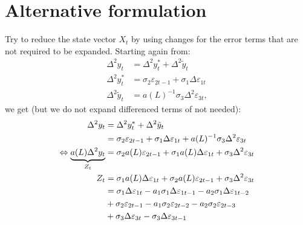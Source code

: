 \documentclass[a4paper,12pt]{article}
\begin{document}
\section{Alternative formulation}

Try to reduce the state vector $X_{t}$ by using changes for the error terms
that are not required to be expanded. Starting again from:%
\begin{align}
\Delta ^{2}y_{t}& =\Delta ^{2}y_{t}^{\ast }+\Delta ^{2}\tilde{y}_{t} \\
\Delta ^{2}y_{t}^{\ast }& =\sigma _{2}\varepsilon _{2t-1}+\sigma _{1}\Delta
\varepsilon _{1t} \\
\Delta ^{2}\tilde{y}_{t}& =a(L)^{-1}\sigma _{3}\Delta ^{2}\varepsilon _{3t},
\end{align}%
we get (but we do not expand differenced terms of not needed):%
\begin{align}
\Delta ^{2}y_{t}& =\Delta ^{2}y_{t}^{\ast }+\Delta ^{2}\tilde{y}_{t}  \notag
\\
& =\sigma _{2}\varepsilon _{2t-1}+\sigma _{1}\Delta \varepsilon
_{1t}+a(L)^{-1}\sigma _{3}\Delta ^{2}\varepsilon _{3t}  \notag \\
\Leftrightarrow \underbrace{a(L)\Delta ^{2}y_{t}}_{Z_{t}}& =\sigma
_{2}a(L)\varepsilon _{2t-1}+\sigma _{1}a(L)\Delta \varepsilon _{1t}+\sigma
_{3}\Delta ^{2}\varepsilon _{3t}  \notag \\
Z_{t}& =\sigma _{1}a(L)\Delta \varepsilon _{1t}+\sigma _{2}a(L)\varepsilon
_{2t-1}+\sigma _{3}\Delta ^{2}\varepsilon _{3t}  \notag \\
& =\sigma _{1}\Delta \varepsilon _{1t}-a_{1}\sigma _{1}\Delta \varepsilon
_{1t-1}-a_{2}\sigma _{1}\Delta \varepsilon _{1t-2}  \notag \\
& +\sigma _{2}\varepsilon _{2t-1}-a_{1}\sigma _{2}\varepsilon
_{2t-2}-a_{2}\sigma _{2}\varepsilon _{2t-3} \\
& +\sigma _{3}\Delta \varepsilon _{3t}-\sigma _{3}\Delta \varepsilon _{3t-1}
\notag
\end{align}
\end{document}
